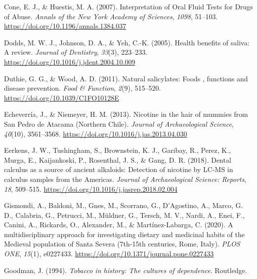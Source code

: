 \documentclass[
  letterpaper,
]{book}
\newlength{\cslhangindent}
\newlength{\cslentryspacingunit} %
\newenvironment{CSLReferences}[2] %
 {%
  \setlength{\parindent}{0pt}
  \ifodd #1
  \let\oldpar\par
  \def\par{\hangindent=\cslhangindent\oldpar}
  \fi
  \setlength{\parskip}{#2\cslentryspacingunit}
 }%
 {}
\begin{document}
\begin{CSLReferences}{1}{0}
\leavevmode{}%
Cone, E. J., \& Huestis, M. A. (2007). Interpretation of {Oral Fluid
Tests} for {Drugs} of {Abuse}. \emph{Annals of the New York Academy of
Sciences}, \emph{1098}, 51--103.
\url{https://doi.org/10.1196/annals.1384.037}

\leavevmode{}%
Dodds, M. W. J., Johnson, D. A., \& Yeh, C.-K. (2005). Health benefits
of saliva: A review. \emph{Journal of Dentistry}, \emph{33}(3),
223--233. \url{https://doi.org/10.1016/j.jdent.2004.10.009}

\leavevmode{}%
Duthie, G. G., \& Wood, A. D. (2011). Natural salicylates: Foods ,
functions and disease prevention. \emph{Food \& Function}, \emph{2}(9),
515--520. \url{https://doi.org/10.1039/C1FO10128E}

\leavevmode{}%
Echeverría, J., \& Niemeyer, H. M. (2013). Nicotine in the hair of
mummies from {San Pedro} de {Atacama} ({Northern Chile}). \emph{Journal
of Archaeological Science}, \emph{40}(10), 3561--3568.
\url{https://doi.org/10.1016/j.jas.2013.04.030}

\leavevmode{}%
Eerkens, J. W., Tushingham, S., Brownstein, K. J., Garibay, R., Perez,
K., Murga, E., Kaijankoski, P., Rosenthal, J. S., \& Gang, D. R. (2018).
Dental calculus as a source of ancient alkaloids: {Detection} of
nicotine by {LC-MS} in calculus samples from the {Americas}.
\emph{Journal of Archaeological Science: Reports}, \emph{18}, 509--515.
\url{https://doi.org/10.1016/j.jasrep.2018.02.004}

\leavevmode{}%
Gismondi, A., Baldoni, M., Gnes, M., Scorrano, G., D'Agostino, A.,
Marco, G. D., Calabria, G., Petrucci, M., Müldner, G., Tersch, M. V.,
Nardi, A., Enei, F., Canini, A., Rickards, O., Alexander, M., \&
Martínez-Labarga, C. (2020). A multidisciplinary approach for
investigating dietary and medicinal habits of the {Medieval} population
of {Santa Severa} (7th-15th centuries, {Rome}, {Italy}). \emph{PLOS
ONE}, \emph{15}(1), e0227433.
\url{https://doi.org/10.1371/journal.pone.0227433}

\leavevmode{}%
Goodman, J. (1994). \emph{Tobacco in history: The cultures of
dependence}. {Routledge}.


\end{CSLReferences}
\end{document}
